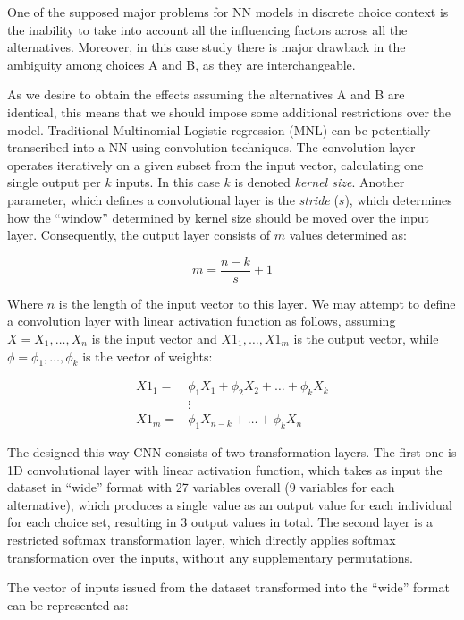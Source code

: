 \documentclass[11pt,]{article}
\begin{document}
One of the supposed major problems for NN models in discrete choice
context is the inability to take into account all the influencing
factors across all the alternatives. Moreover, in this case study there
is major drawback in the ambiguity among choices A and B, as they are
interchangeable.

As we desire to obtain the effects assuming the alternatives A and B are
identical, this means that we should impose some additional restrictions
over the model. Traditional Multinomial Logistic regression (MNL) can be
potentially transcribed into a NN using convolution techniques. The
convolution layer operates iteratively on a given subset from the input
vector, calculating one single output per \(k\) inputs. In this case
\(k\) is denoted \emph{kernel size}. Another parameter, which defines a
convolutional layer is the \emph{stride} (\(s\)), which determines how
the ``window'' determined by kernel size should be moved over the input
layer. Consequently, the output layer consists of \(m\) values
determined as:

\begin{equation}
m = \frac{n - k}{s} + 1
\end{equation}

Where \(n\) is the length of the input vector to this layer. We may
attempt to define a convolution layer with linear activation function as
follows, assuming \(X = X_1, \dots, X_n\) is the input vector and
\(X1_1, \dots, X1_m\) is the output vector, while
\(\phi = \phi_1, \dots, \phi_k\) is the vector of weights:

\begin{align}
X1_1 = & \phi_1 X_1 + \phi_2 X_2 + \dots + \phi_k X_k \nonumber \\
& \vdots \\
X1_m = & \phi_1 X_{n-k} + \dots + \phi_k X_n \nonumber
\end{align}

The designed this way CNN consists of two transformation layers. The
first one is 1D convolutional layer with linear activation function,
which takes as input the dataset in ``wide'' format with 27 variables
overall (9 variables for each alternative), which produces a single
value as an output value for each individual for each choice set,
resulting in 3 output values in total. The second layer is a restricted
softmax transformation layer, which directly applies softmax
transformation over the inputs, without any supplementary permutations.

The vector of inputs issued from the dataset transformed into the
``wide'' format can be represented as:
\end{document}

